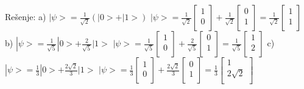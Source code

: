 \documentclass{article}
\begin{document}
\vspace*{0.4cm}\newline
Rešenje: \newline
a) $|\psi> = \frac{1}{\sqrt{2}}(|0> + |1>)$
\newline \hspace*{0.5cm}$|\psi> = \frac{1}{\sqrt{2}}\begin{bmatrix}
    1 \\
    0 \\    
\end{bmatrix} + \frac{1}{\sqrt{2}}\begin{bmatrix}
    0 \\
    1 \\
\end{bmatrix} = \frac{1}{\sqrt{2}}\begin{bmatrix}
    1 \\
    1 \\
\end{bmatrix}$
\vspace{0.5cm}\newline 
b) $|\psi> = \frac{1}{\sqrt{5}}|0> + \frac{2}{\sqrt{5}}|1>$
\newline \hspace*{0.5cm}$|\psi> = \frac{1}{\sqrt{5}}\begin{bmatrix}
    1 \\
    0 \\    
\end{bmatrix} + \frac{2}{\sqrt{5}}\begin{bmatrix}
    0 \\
    1 \\
\end{bmatrix} = \frac{1}{\sqrt{5}}\begin{bmatrix}
    1 \\
    2 \\
\end{bmatrix}$
\vspace{0.5cm}\newline 
c) $|\psi> = \frac{1}{3}|0> + \frac{2\sqrt{2}}{3}|1>$
\newline \hspace*{0.5cm}$|\psi> = \frac{1}{3}\begin{bmatrix}
    1 \\
    0 \\    
\end{bmatrix} + \frac{2\sqrt{2}}{3}\begin{bmatrix}
    0 \\
    1 \\
\end{bmatrix} = \frac{1}{3}\begin{bmatrix}
    1 \\
    2\sqrt{2} \\
\end{bmatrix}$
\end{document}
